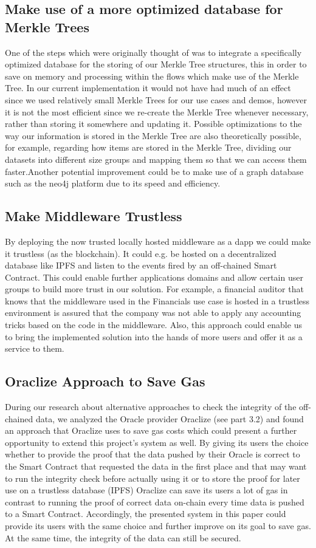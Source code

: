 \subsection{Make use of a more optimized database for Merkle Trees}
One of the steps which were originally thought of was to integrate a specifically optimized database for the storing of our Merkle Tree structures, this in order to save on memory and processing within the flows which make use of the Merkle Tree. 
In our current implementation it would not have had much of an effect since we used relatively small Merkle Trees for our use cases and demos, however it is not the most efficient since we re-create the Merkle Tree whenever necessary, rather than storing it somewhere and updating it. 
Possible optimizations to the way our information is stored in the Merkle Tree are also theoretically possible, for example, regarding how items are stored in the Merkle Tree, dividing our datasets into different size groups and mapping them so that we can access them faster.Another potential improvement could be to make use of a graph database such as the neo4j platform due to its speed and efficiency.


\subsection{Make Middleware Trustless}
By deploying the now trusted locally hosted middleware as a dapp we could make it trustless (as the blockchain). It could e.g. be hosted on a decentralized database like IPFS and listen to the events fired by an off-chained Smart Contract. This could enable further applications domains and allow certain user groups to build more trust in our solution. For example, a financial auditor that knows that the middleware used in the Financials use case is hosted in a trustless environment is assured that the company was not able to apply any accounting tricks based on the code in the middleware. Also, this approach could enable us to bring the implemented solution into the hands of more users and offer it as a service to them.

\subsection{Oraclize Approach to Save Gas}
During our research about alternative approaches to check the integrity of the off-chained data, we analyzed the Oracle provider Oraclize (see part 3.2) and found an approach that Oraclize uses to save gas costs which could present a further opportunity to extend this project’s system as well. By giving its users the choice whether to provide the proof that the data pushed by their Oracle is correct to the Smart Contract that requested the data in the first place and that may want to run the integrity check before actually using it or to store the proof for later use on a trustless database (IPFS) Oraclize can save its users a lot of gas in contrast to running the proof of correct data on-chain every time data is pushed to a Smart Contract. Accordingly, the presented system in this paper could provide its users with the same choice and further improve on its goal to save gas. At the same time, the integrity of the data can still be secured.

